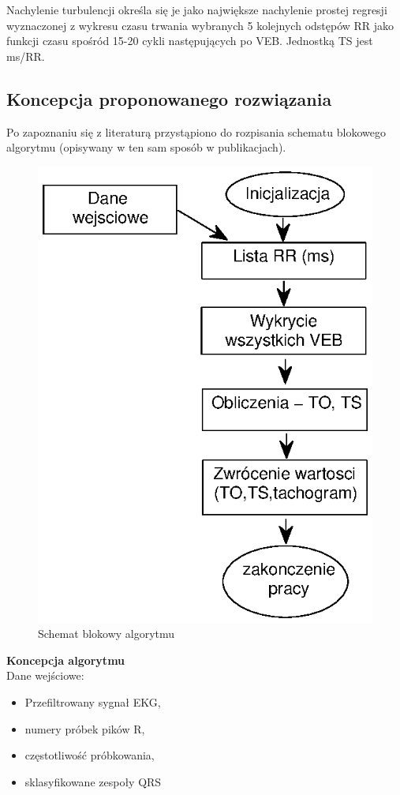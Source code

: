 Nachylenie turbulencji określa się je jako największe nachylenie prostej regresji wyznaczonej z wykresu czasu trwania wybranych 5 kolejnych odstępów RR jako funkcji czasu spośród 15-20 cykli następujących po VEB. Jednostką TS jest ms/RR.

\subsection{Koncepcja proponowanego rozwiązania}
Po zapoznaniu się z literaturą przystąpiono do rozpisania schematu blokowego algorytmu (opisywany w ten sam sposób w publikacjach). 

\begin{figure}[!h]
\centerline{\includegraphics[scale=0.8]{HRT/HRT4.eps}}
\caption{Schemat blokowy algorytmu}
\end{figure}



\textbf{Koncepcja algorytmu}\\
Dane wejściowe:
\begin{itemize}
\item Przefiltrowany sygnał EKG, 
\item numery próbek pików R, 
\item częstotliwość próbkowania, 
\item sklasyfikowane zespoły QRS\\
\end{itemize}

